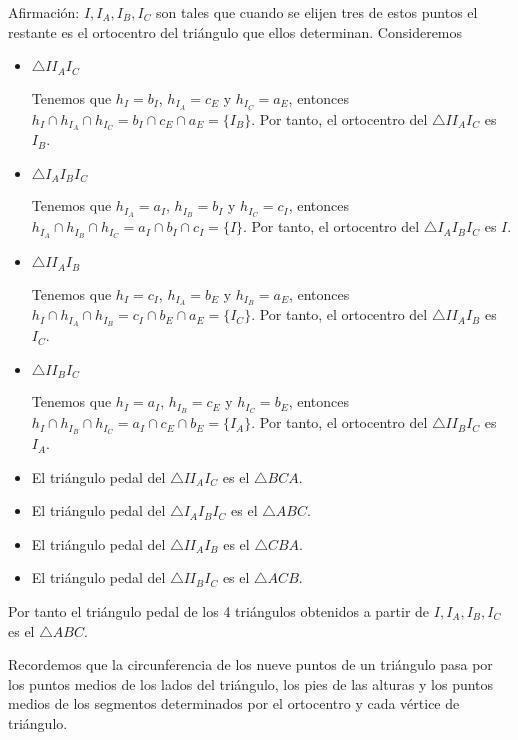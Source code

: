 Afirmación: $I,I_{A},I_{B},I_{C}$ son tales que cuando se elijen tres de estos puntos el restante es el ortocentro del triángulo que ellos determinan.
Consideremos
\begin{itemize}
\item $\triangle II_{A}I_{C}$

Tenemos que $h_{I}=b_{I}$, $h_{I_{A}}=c_{E}$ y $h_{I_{C}}=a_{E}$, entonces $h_{I}\cap h_{I_{A}}\cap h_{I_{C}}=b_{I}\cap c_{E}\cap a_{E}=\{I_{B}\}$. Por tanto, el ortocentro del $\triangle II_{A}I_{C}$ es $I_{B}$.
\item $\triangle I_{A}I_{B}I_{C}$

Tenemos que $h_{I_{A}}=a_{I}$, $h_{I_{B}}=b_{I}$ y $h_{I_{C}}=c_{I}$, entonces $h_{I_{A}}\cap h_{I_{B}}\cap h_{I_{C}}=a_{I}\cap b_{I}\cap c_{I}=\{I\}$. Por tanto, el ortocentro del $\triangle I_{A}I_{B}I_{C}$ es $I$.
\item $\triangle II_{A}I_{B}$

Tenemos que $h_{I}=c_{I}$, $h_{I_{A}}=b_{E}$ y $h_{I_{B}}=a_{E}$, entonces $h_{I}\cap h_{I_{A}}\cap h_{I_{B}}=c_{I}\cap b_{E}\cap a_{E}=\{I_{C}\}$. Por tanto, el ortocentro del $\triangle II_{A}I_{B}$ es $I_{C}$.
\item $\triangle II_{B}I_{C}$

Tenemos que $h_{I}=a_{I}$, $h_{I_{B}}=c_{E}$ y $h_{I_{C}}=b_{E}$, entonces $h_{I}\cap h_{I_{B}}\cap h_{I_{C}}=a_{I}\cap c_{E}\cap b_{E}=\{I_{A}\}$. Por tanto, el ortocentro del $\triangle II_{B}I_{C}$ es $I_{A}$.
\end{itemize}

\begin{obs}
\begin{itemize}
\item El triángulo pedal del $\triangle II_{A}I_{C}$ es el $\triangle BCA$.
\item El triángulo pedal del $\triangle I_{A}I_{B}I_{C}$ es el $\triangle ABC$. 
\item El triángulo pedal del $\triangle II_{A}I_{B}$ es el $\triangle CBA$.
\item El triángulo pedal del $\triangle II_{B}I_{C}$ es el $\triangle ACB$.
\end{itemize}
Por tanto el triángulo pedal de los 4 triángulos obtenidos a partir de $I,I_{A},I_{B},I_{C}$ es el $\triangle ABC$. 
\end{obs}

Recordemos que la circunferencia de los nueve puntos de un triángulo pasa por los puntos medios de los lados del triángulo, los pies de las alturas y los puntos medios de los segmentos determinados por el ortocentro y cada vértice de triángulo. 

